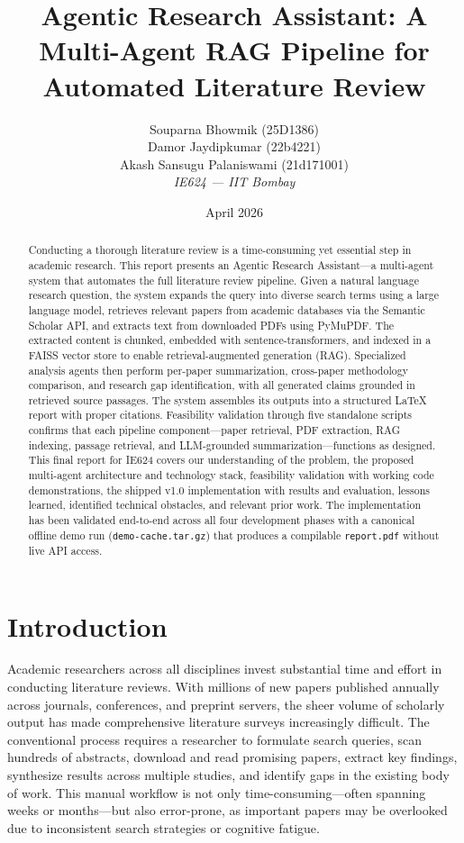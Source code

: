 \documentclass[12pt,a4paper]{article}
\title{Agentic Research Assistant: A Multi-Agent RAG Pipeline for Automated Literature Review}
\author{
  Souparna Bhowmik (25D1386) \\
  Damor Jaydipkumar (22b4221) \\
  Akash Sansugu Palaniswami (21d171001) \\[1em]
  \textit{IE624 --- IIT Bombay}
}
\date{April 2026}
\begin{document}
\maketitle

\begin{abstract}
Conducting a thorough literature review is a time-consuming yet essential step in academic research. This report presents an Agentic Research Assistant---a multi-agent system that automates the full literature review pipeline. Given a natural language research question, the system expands the query into diverse search terms using a large language model, retrieves relevant papers from academic databases via the Semantic Scholar API, and extracts text from downloaded PDFs using PyMuPDF. The extracted content is chunked, embedded with sentence-transformers, and indexed in a FAISS vector store to enable retrieval-augmented generation (RAG). Specialized analysis agents then perform per-paper summarization, cross-paper methodology comparison, and research gap identification, with all generated claims grounded in retrieved source passages. The system assembles its outputs into a structured LaTeX report with proper citations. Feasibility validation through five standalone scripts confirms that each pipeline component---paper retrieval, PDF extraction, RAG indexing, passage retrieval, and LLM-grounded summarization---functions as designed. This final report for IE624 covers our understanding of the problem, the proposed multi-agent architecture and technology stack, feasibility validation with working code demonstrations, the shipped v1.0 implementation with results and evaluation, lessons learned, identified technical obstacles, and relevant prior work. The implementation has been validated end-to-end across all four development phases with a canonical offline demo run (\texttt{demo-cache.tar.gz}) that produces a compilable \texttt{report.pdf} without live API access.
\end{abstract}


\section{Introduction}

Academic researchers across all disciplines invest substantial time and effort in conducting literature reviews. With millions of new papers published annually across journals, conferences, and preprint servers, the sheer volume of scholarly output has made comprehensive literature surveys increasingly difficult. The conventional process requires a researcher to formulate search queries, scan hundreds of abstracts, download and read promising papers, extract key findings, synthesize results across multiple studies, and identify gaps in the existing body of work. This manual workflow is not only time-consuming---often spanning weeks or months---but also error-prone, as important papers may be overlooked due to inconsistent search strategies or cognitive fatigue.
\end{document}
